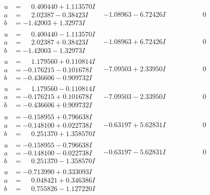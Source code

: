 \documentclass[1p]{elsarticle_modified}
\theoremstyle{definition}
\begin{document}
$$\begin{array}{c|c|c}
 \hline 
\begin{aligned}
u &= \phantom{-}0.400440 + 1.113570 I \\
a &= \phantom{-}2.02387 - 0.38423 I \\
b &= -1.42003 + 1.32973 I\end{aligned}
 & -1.08963 - 6.72426 I & \phantom{-0.000000 } 0 \\ \hline\begin{aligned}
u &= \phantom{-}0.400440 - 1.113570 I \\
a &= \phantom{-}2.02387 + 0.38423 I \\
b &= -1.42003 - 1.32973 I\end{aligned}
 & -1.08963 + 6.72426 I & \phantom{-0.000000 } 0 \\ \hline\begin{aligned}
u &= \phantom{-}1.179560 + 0.110814 I \\
a &= -0.176215 - 0.101678 I \\
b &= -0.436606 - 0.909732 I\end{aligned}
 & -7.09503 + 2.33950 I & \phantom{-0.000000 } 0 \\ \hline\begin{aligned}
u &= \phantom{-}1.179560 - 0.110814 I \\
a &= -0.176215 + 0.101678 I \\
b &= -0.436606 + 0.909732 I\end{aligned}
 & -7.09503 - 2.33950 I & \phantom{-0.000000 } 0 \\ \hline\begin{aligned}
u &= -0.158955 + 0.796638 I \\
a &= -0.148100 + 0.022738 I \\
b &= \phantom{-}0.251370 + 1.358570 I\end{aligned}
 & -0.63197 + 5.62831 I & \phantom{-0.000000 } 0 \\ \hline\begin{aligned}
u &= -0.158955 - 0.796638 I \\
a &= -0.148100 - 0.022738 I \\
b &= \phantom{-}0.251370 - 1.358570 I\end{aligned}
 & -0.63197 - 5.62831 I & \phantom{-0.000000 } 0 \\ \hline\begin{aligned}
u &= -0.713990 + 0.333093 I \\
a &= \phantom{-}0.048421 + 0.346386 I \\
b &= \phantom{-}0.755826 - 1.127220 I\end{aligned}

\end{array}$$
\end{document}
